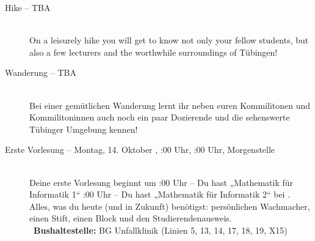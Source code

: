 \begin{description}
\ifml
	\item[Hike -- TBA]~\\
	On a leisurely hike you will get to know not only your fellow students,
	but also a few lecturers and the worthwhile surroundings of Tübingen!
\else
	\item[Wanderung -- TBA]~\\
	Bei einer gemütlichen Wanderung lernt ihr neben euren Kommilitonen und Kommilitoninnen auch
	noch ein paar Dozierende und die sehenswerte Tübinger Umgebung kennen!
\fi


\ifbachelor
	\item[Erste Vorlesung -- Montag, 14. Oktober \YEAR, \ifwintersemester 8:00 Uhr, \else 10:00 Uhr, \fi Morgenstelle]~\\
	Deine erste Vorlesung beginnt um
	:00 Uhr -- Du hast „Mathematik für Informatik 1“  \fi
	:00 Uhr -- Du hast „Mathematik für Informatik 2“  \fi
	bei \Matheprof.
	Alles, was du heute (und in Zukunft) benötigst: persönlichen Wachmacher, einen Stift, einen Block und den Studierendenausweis.\\
	~\textbf{Bushaltestelle:} BG Unfallklinik (Linien 5, 13, 14, 17, 18, 19, X15)
\fi


\end{description}
